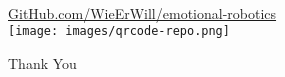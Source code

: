 \documentclass[aspectratio=169]{beamer}
\begin{document}
\begin{frame}[c]{}
  \centering
  \begin{minipage}{\textwidth}
    \centering
    \Large {}\\
    \href{https://github.com/wieerwill/emotional-robotics}{GitHub.com/WieErWill/emotional-robotics}\\
    \vspace{.4cm}
    \texttt{[image: images/qrcode-repo.png]}
  \end{minipage}
\end{frame}

\begin{frame}[c]{}
  \centering
  \begin{minipage}{\textwidth}
    \centering
    \Huge Thank You\\
    \Large {}
  \end{minipage}
\end{frame}
\end{document}
